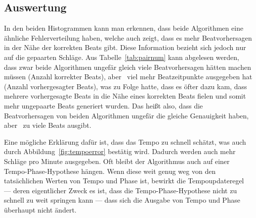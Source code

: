 {	\subsection{Auswertung}
	{
		In den beiden Histogrammen kann man erkennen,
			dass beide Algorithmen eine ähnliche Fehlerverteilung haben,
			welche auch zeigt,
			dass es mehr Beatvorhersagen in der Nähe der korrekten Beats gibt.
		Diese Information bezieht sich jedoch nur auf die gepaarten Schläge.
		Aus Tabelle~\ref{tab:pairnum} kann abgelesen werden,
			dass zwar beide Algorithmen ungefär gleich viele Beatvorhersagen hätten machen müssen (Anzahl korrekter Beats),
			aber~\cite{2011_PlRoSt} viel mehr Beatzeitpunkte ausgegeben hat (Anzahl vorhergesagter Beats),
			was zu Folge hatte,
			dass es öfter dazu kam,
			dass mehrere vorhergesagte Beats in die Nähe eines korrekten Beats fielen
			und somit mehr ungepaarte Beats generiert wurden.
		Das heißt also,
			dass die Beatvorhersagen von beiden Algorithmen ungefär die gleiche Genauigkeit haben,
			aber~\cite{2011_PlRoSt} zu viele Beats ausgibt.

		Eine mögliche Erklärung dafür ist,
			dass \cite{2011_PlRoSt} das Tempo zu schnell schätzt,
			was auch durch Abbildung~\ref{fig:tempoerror} bestätig wird.
		Dadurch werden auch mehr Schläge pro Minute ausgegeben.
		Oft bleibt der Algorithmus auch auf einer Tempo-Phase-Hypothese hängen.
		Wenn diese weit genug weg von den tatsächlichen Werten von Tempo und Phase ist,
			bewirkt die Tempoupdateregel ---
			deren eigentlicher Zweck es ist,
			dass die Tempo-Phase-Hypothese nicht zu schnell zu weit springen kann ---
			dass sich die Ausgabe von Tempo und Phase überhaupt nicht ändert.
	}
}

